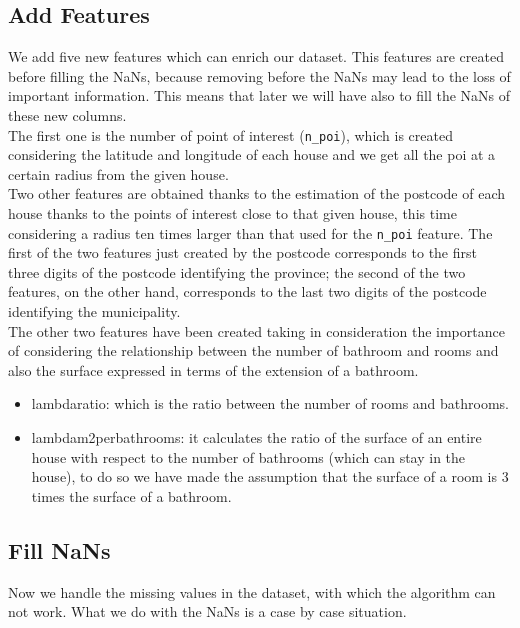 \documentclass[10pt, notitlepage]{article}
\begin{document}
\subsection{Add Features}
\color{black}
We add five new features which can enrich our dataset. This features are created before filling the NaNs, because removing before the NaNs may lead to the loss of important information. This means that later we will have also to fill the NaNs of these new columns. 
\\
The first one is the number of point of interest (\texttt{n\_poi}), which is created considering the latitude and longitude of each house and we get all the poi at a certain radius from the given house. 
\\
Two other features are obtained thanks to the estimation of the postcode of each house thanks to the points of interest close to that given house, this time considering a radius ten times larger than that used for the \texttt{n\_poi} feature. The first of the two features just created by the postcode corresponds to the first three digits of the postcode identifying the province; the second of the two features, on the other hand, corresponds to the last two digits of the postcode identifying the municipality. 
\\
The other two features have been created taking in consideration the importance of considering the relationship between the number of bathroom and rooms and also the surface expressed in terms of the extension of a bathroom. 
\begin{itemize}
    \item lambda\textunderscore ratio: which is the ratio between the number of rooms and bathrooms.
    \item lambda\textunderscore m2\textunderscore per\textunderscore bathrooms: it calculates the ratio of the surface of an entire house with respect to the number of bathrooms (which can stay in the house), to do so we have made the assumption that the surface of a room is 3 times the surface of a bathroom. 
\end{itemize}

\color{blue}
\subsection{Fill NaNs}
\color{black}
Now we handle the missing values in the dataset, with which the algorithm can not work. What we do with the NaNs is a case by case situation. 

\color{blue}
\end{document}
